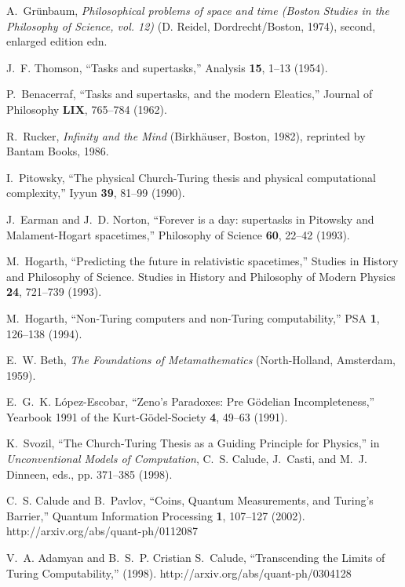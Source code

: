\documentclass[12pt]{article}
\begin{document}
\begin{thebibliography}{10}
A.~Gr{\"{u}}nbaum, {\em Philosophical problems of space and time (Boston
  Studies in the Philosophy of Science, vol. 12)\/} (D. Reidel,
  Dordrecht/Boston, 1974), second, enlarged edition edn.

J.~F. Thomson, \enquote{Tasks and supertasks,} Analysis {\bf 15}, 1--13 (1954).

P.~Benacerraf, \enquote{Tasks and supertasks, and the modern {E}leatics,}
  Journal of Philosophy {\bf LIX}, 765--784 (1962).

R.~Rucker, {\em Infinity and the Mind\/} (Birkh{\"{a}}user, Boston, 1982),
  reprinted by Bantam Books, 1986.

I.~Pitowsky, \enquote{The physical {C}hurch-{T}uring thesis and physical
  computational complexity,} Iyyun {\bf 39}, 81--99 (1990).

J.~Earman and J.~D. Norton, \enquote{Forever is a day: supertasks in {P}itowsky
  and {M}alament-{H}ogart spacetimes,} Philosophy of Science {\bf 60}, 22--42
  (1993).

M.~Hogarth, \enquote{Predicting the future in relativistic spacetimes,} Studies
  in History and Philosophy of Science. Studies in History and Philosophy of
  Modern Physics {\bf 24}, 721--739 (1993).

M.~Hogarth, \enquote{Non-{T}uring computers and non-{T}uring computability,}
  PSA {\bf 1}, 126--138 (1994).

E.~W. Beth, {\em The Foundations of Metamathematics\/} (North-Holland,
  Amsterdam, 1959).

E.~G.~K. L{\'{o}}pez-Escobar, \enquote{{Z}eno's Paradoxes: Pre {G}{\"{o}}delian
  Incompleteness,} Yearbook 1991 of the Kurt-G{\"{o}}del-Society {\bf 4},
  49--63 (1991).

K.~Svozil, \enquote{The {C}hurch-{T}uring Thesis as a Guiding Principle for
  Physics,} in {\em Unconventional Models of Computation\/}, C.~S. Calude,
  J.~Casti, and M.~J. Dinneen, eds.,  pp. 371--385 (1998).

C.~S. Calude and B.~Pavlov, \enquote{Coins, Quantum Measurements, and
  {T}uring's Barrier,} Quantum Information Processing {\bf 1}, 107--127 (2002).
\newline http://arxiv.org/abs/quant-ph/0112087

V.~A. Adamyan and B.~S.~P. Cristian S.~Calude, \enquote{Transcending the Limits
  of {T}uring Computability,}  (1998).
\newline http://arxiv.org/abs/quant-ph/0304128


\end{thebibliography}
\end{document}

